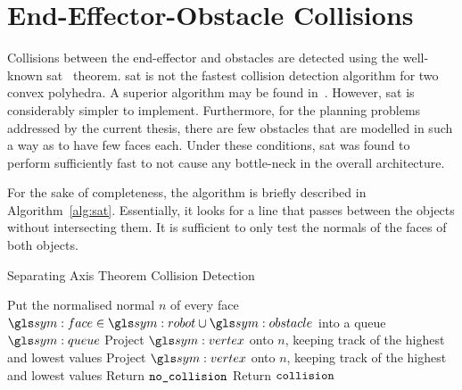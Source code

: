 \section{End-Effector-Obstacle Collisions}%
\label{sec:end_effector_obstacle_collisions}

	Collisions between the end-effector and obstacles are detected using the
	well-known
	\gls{sat}~\cite{bib:planning:hierarchical_structure_for_rapid_interference_detection}
	theorem. \gls{sat} is not the fastest collision detection algorithm for two
	convex polyhedra. A superior algorithm may be found
	in~\cite{bib:planning:detecting_intersections_between_convex_polyhedra}.
	However, \gls{sat} is considerably simpler to implement. Furthermore, for
	the planning problems addressed by the current thesis, there are few
	obstacles that are modelled in such a way as to have few faces each. Under
	these conditions, \gls{sat} was found to perform sufficiently fast to not
	cause any bottle-neck in the overall architecture.

	For the sake of completeness, the algorithm is briefly described in
	Algorithm~\ref{alg:sat}. Essentially, it looks for a line that passes
	between the objects without intersecting them. It is sufficient to only test
	the normals of the faces of both objects.

	\begin{algorithm}[ht]
		\caption{Separating Axis Theorem Collision
		Detection~\cite{bib:planning:hierarchical_structure_for_rapid_interference_detection}}%
		\label{alg:sat}
		\begin{algorithmic}[1]
				\State{}Put the normalised normal $n$ of every face $\face \in \robot\cup\obstacle$ into a queue $\queue$
						\State{}Project $\vertex$ onto $n$, keeping track of the highest and lowest values
					\EndFor{}
						\State{}Project $\vertex$ onto $n$, keeping track of the highest and lowest values
					\EndFor{}
						\State{} Return $\texttt{no\_collision}$
					\EndIf{}
				\EndFor{}
				\State{}Return $\texttt{collision}$
			\EndProcedure{}
		\end{algorithmic}
	\end{algorithm}

